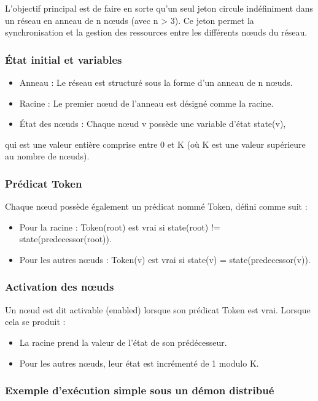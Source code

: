 \documentclass[11pt]{article}
\begin{document}
L'objectif principal est de faire en sorte qu'un seul jeton circule indéfiniment dans un réseau en anneau de n nœuds (avec n > 3). 
Ce jeton permet la synchronisation et la gestion des ressources entre les différents nœuds du réseau.

\subsubsection{État initial et variables}
\label{sec:org85ce17b}
\begin{itemize}
\item Anneau : Le réseau est structuré sous la forme d'un anneau de n nœuds.
\item Racine : Le premier nœud de l'anneau est désigné comme la racine.
\item État des nœuds : Chaque nœud v possède une variable d'état state(v),
\end{itemize}
qui est une valeur entière comprise entre 0 et K (où K est une valeur supérieure au nombre de nœuds).

\subsubsection{Prédicat Token}
\label{sec:orgb6d0367}
Chaque nœud possède également un prédicat nommé Token, défini comme suit :
\begin{itemize}
\item Pour la racine : Token(root) est vrai si state(root) != state(predecessor(root)).
\item Pour les autres nœuds : Token(v) est vrai si state(v) = state(predecessor(v)).
\end{itemize}

\subsubsection{Activation des nœuds}
\label{sec:org0bbfac8}
Un nœud est dit activable (enabled) lorsque son prédicat Token est vrai. Lorsque cela se produit :
\begin{itemize}
\item La racine prend la valeur de l'état de son prédécesseur.
\item Pour les autres nœuds, leur état est incrémenté de 1 modulo K.
\end{itemize}

\subsubsection{Exemple d'exécution simple sous un démon distribué}
\label{sec:org571c8eb}
\end{document}
